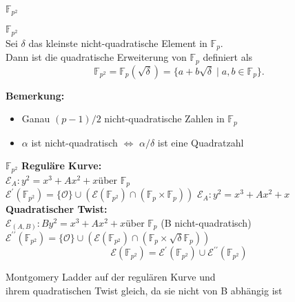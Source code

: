 \begin{frame}{$\mathbb{F}_{p^2}$}
    \begin{definitionblock}{$\mathbb{F}_{p^2}$}
        \\ Sei $\delta$ das kleinste nicht-quadratische Element in $\mathbb{F}_p$.\\
        Dann ist die quadratische Erweiterung von $\mathbb{F}_p$ definiert als
        \[\mathbb{F}_{p^2} =\mathbb{F}_p(\sqrt{\delta})=\{a+b\sqrt{\delta} \mid a,b\in \mathbb{F}_p\}.\]
    \end{definitionblock}
    \vspace{1em}
    \textbf{Bemerkung:}\\
    \begin{itemize}
        \item Ganau $(p-1)/2$ nicht-quadratische Zahlen in $\mathbb{F}_p$
        \item $\alpha$ ist nicht-quadratisch $\Leftrightarrow$  $\alpha/\delta$ ist eine Quadratzahl 
    \end{itemize}
    
\end{frame}

\begin{frame}{$\mathbb{F}_{p^2}$}
    \textbf{Reguläre Kurve:}\\
    $\mathcal{E}_A:y^2=x^3+Ax^2+x$\quad über $\mathbb{F}_p$\\
    $\mathcal{E}^\prime(\mathbb{F}_{p^2})=\{\mathcal{O}\}\cup (\mathcal{E}(\mathbb{F}_{p^2})\cap (\mathbb{F}_p\times\mathbb{F}_p))$
    $\mathcal{E}_A:y^2=x^3+Ax^2+x$\\
    \vspace{1em}
    \textbf{Quadratischer Twist:}\\
    $\mathcal{E}_{(A,B)}:By^2=x^3+Ax^2+x$\quad über $\mathbb{F}_p$ (B nicht-quadratisch)\\
    $\mathcal{E}^{\prime\prime}(\mathbb{F}_{p^2})=\{\mathcal{O}\}\cup (\mathcal{E}(\mathbb{F}_{p^2})\cap (\mathbb{F}_p\times\sqrt{\delta}\mathbb{F}_p))$
    \[\mathcal{E}(\mathbb{F}_{p^2})=\mathcal{E}^\prime(\mathbb{F}_{p^2})\cup\mathcal{E}^{\prime\prime}(\mathbb{F}_{p^2})\]
    \begin{center}
        Montgomery Ladder auf der regulären Kurve und \\ihrem quadratischen Twist gleich, da sie nicht von B abhängig ist
    \end{center}
\end{frame}